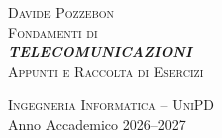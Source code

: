 \begin{titlepage}
    \centering
    
    \vspace*{2cm}
    {\large \textsc{Davide Pozzebon}}\\[3cm]
    
    {\Huge \textsc{Fondamenti di}}\\[0.3cm]
    {\Huge \textbf{\textit{\textcolor{nord11}{TELECOMUNICAZIONI}}}}\\[1.5cm]
    
    {\Large \textsc{Appunti e Raccolta di Esercizi}}\\[2cm]
    
    \vfill
    
    {\large \textsc{Ingegneria Informatica -- UniPD}}\\[0.3cm]
    {\large Anno Accademico 2026--2027}
    
    \vspace*{1cm}
\end{titlepage}
